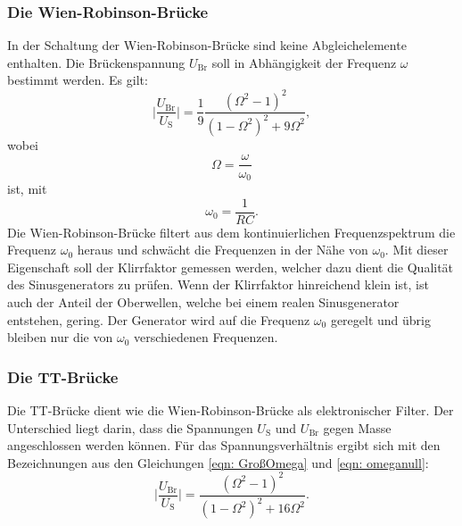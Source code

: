     \subsubsection{Die Wien-Robinson-Brücke}

        In der Schaltung der Wien-Robinson-Brücke sind keine Abgleichelemente enthalten. 
        Die Brückenspannung $U_\text{Br}$ soll in Abhängigkeit der Frequenz $\omega$ bestimmt werden.
        Es gilt:
        \begin{equation}
            \lvert \frac{U_\text{Br}}{U_\text{S}} \rvert = \frac{1}{9} \frac{(\Omega^2 - 1)^2}{(1 - \Omega^2)^2 + 9\Omega^2},
        \end{equation} 
        wobei 
        \begin{equation}
            \Omega = \frac{\omega}{\omega_0} \label{eqn: GroßOmega}
        \end{equation}
        ist, mit 
        \begin{equation}
            \omega_0 = \frac{1}{RC}. \label{eqn: omeganull}
        \end{equation}
        Die Wien-Robinson-Brücke filtert aus dem kontinuierlichen Frequenzspektrum die Frequenz $\omega_0$ heraus
        und schwächt die Frequenzen in der Nähe von $\omega_0$.
        Mit dieser Eigenschaft soll der Klirrfaktor gemessen werden, welcher dazu dient die Qualität des
        Sinusgenerators zu prüfen.
        Wenn der Klirrfaktor hinreichend klein ist, ist auch der Anteil der Oberwellen, welche bei einem
        realen Sinusgenerator entstehen, gering.
        Der Generator wird auf die Frequenz $\omega_0$ geregelt und übrig bleiben nur die von $\omega_0$ 
        verschiedenen Frequenzen.

    \subsubsection{Die TT-Brücke}

        Die TT-Brücke dient wie die Wien-Robinson-Brücke als elektronischer Filter.
        Der Unterschied liegt darin, dass die Spannungen $U_\text{S}$ und $U_\text{Br}$ gegen Masse 
        angeschlossen werden können.
        Für das Spannungsverhältnis ergibt sich mit den Bezeichnungen
        aus den Gleichungen \eqref{eqn: GroßOmega} und \eqref{eqn: omeganull}:
        \begin{equation}
            \lvert \frac{U_\text{Br}}{U_\text{S}} \rvert = \frac{(\Omega^2 - 1)^2}{(1 - \Omega^2)^2 + 16\Omega^2}.
        \end{equation}

